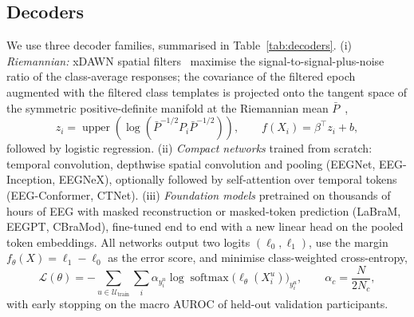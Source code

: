 \subsection{Decoders}
\label{sec:decoders}
We use three decoder families, summarised in Table~\ref{tab:decoders}. (i) \emph{Riemannian:} xDAWN spatial
filters~\citep{rivet2009xdawn} maximise the signal-to-signal-plus-noise ratio of the class-average responses;
the covariance of the filtered epoch augmented with the filtered class templates is projected onto the tangent
space of the symmetric positive-definite manifold at the Riemannian mean $\bar P$~\citep{barachant2012multiclass},
\begin{equation}
z_i=\operatorname{upper}\!\left(\log\!\left(\bar P^{-1/2}P_i\bar P^{-1/2}\right)\right),\qquad f(X_i)=\beta^\top z_i+b,
\label{eq:tangent}
\end{equation}
followed by logistic regression. (ii) \emph{Compact networks} trained from scratch: temporal convolution,
depthwise spatial convolution and pooling (EEGNet, EEG-Inception, EEGNeX), optionally followed by
self-attention over temporal tokens (EEG-Conformer, CTNet). (iii) \emph{Foundation models} pretrained on
thousands of hours of EEG with masked reconstruction or masked-token prediction (LaBraM, EEGPT, CBraMod),
fine-tuned end to end with a new linear head on the pooled token embeddings. All networks output two logits $(\ell_0,\ell_1)$, use the margin $f_\theta(X)=\ell_1-\ell_0$ as the error
score, and minimise class-weighted cross-entropy,
\begin{equation}
\mathcal L(\theta)=-\sum_{u\in\mathcal U_{\text{train}}}\sum_i \alpha_{y^u_i}\log\operatorname{softmax}\big(\ell_\theta(X^u_i)\big)_{y^u_i},\qquad
\alpha_c=\frac{N}{2N_c},
\label{eq:loss}
\end{equation}
with early stopping on the macro AUROC of held-out validation participants.

